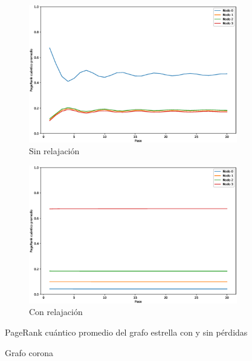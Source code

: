 \documentclass[xetex,mathserif,serif]{beamer}
\begin{document}
\begin{frame}
\begin{figure}[H]
    \centering
    \begin{subfigure}[m]{0.9\textwidth}
        \centering
        \includegraphics[width=0.9\linewidth]{img/star-mean-lossless.eps}
        \caption{Sin relajación}
    \end{subfigure}
    \begin{subfigure}[m]{0.9\textwidth}
        \centering
        \includegraphics[width=0.9\linewidth]{img/star-mean-lossy.eps}
        \caption{Con relajación}
    \end{subfigure}
    \caption[PageRank cuántico promedio del grafo estrella con y sin pérdidas]{PageRank cuántico promedio del grafo estrella con y sin pérdidas}
    \label{fig:meanstarlossy}
\end{figure}








\begin{figure}[H]
    \centering
    \caption[Grafo corona]{Grafo corona}
    \label{fig:crown}
\end{figure}


\end{frame}
\end{document}
